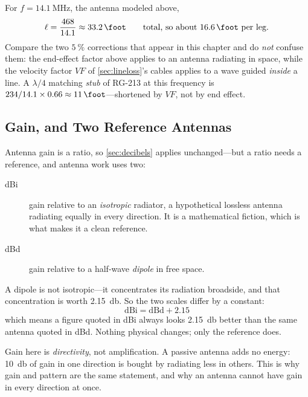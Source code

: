 \begin{workedbox}
For \(f=\SI{14.1}{\mega\hertz}\), the antenna modeled above,
\[
\ell=\frac{468}{14.1}\approx\SI{33.2}{\foot}
\qquad\text{total, so about \SI{16.6}{\foot} per leg.}
\]
Compare the two \(\SI{5}{\percent}\) corrections that appear in this chapter and do
\emph{not} confuse them: the end-effect factor above applies to an antenna radiating
in space, while the velocity factor \(VF\) of \cref{sec:lineloss}'s cables applies to
a wave guided \emph{inside} a line. A \(\lambda/4\) matching \emph{stub} of RG-213 at
this frequency is \(234/14.1\times0.66\approx\SI{11}{\foot}\)---shortened by
\(VF\), not by end effect.
\end{workedbox}

\subsection{Gain, and Two Reference Antennas}
Antenna gain is a ratio, so \cref{sec:decibels} applies unchanged---but a ratio needs
a reference, and antenna work uses two:
\begin{description}
\item[dBi] gain relative to an \emph{isotropic} radiator, a hypothetical lossless
antenna radiating equally in every direction. It is a mathematical fiction, which is
what makes it a clean reference.
\item[dBd] gain relative to a half-wave \emph{dipole} in free space.
\end{description}
A dipole is not isotropic---it concentrates its radiation broadside, and that
concentration is worth \SI{2.15}{\decibel}. So the two scales differ by a constant:
\[
\boxed{\;\mathrm{dBi}=\mathrm{dBd}+2.15\;}
\]
which means a figure quoted in dBi always looks \SI{2.15}{\decibel} better than the
same antenna quoted in dBd. Nothing physical changes; only the reference does.

\begin{mistakebox}
Gain here is \emph{directivity}, not amplification. A passive antenna adds no energy:
\SI{10}{\decibel} of gain in one direction is bought by radiating less in others.
This is why gain and pattern are the same statement, and why an antenna cannot have
gain in every direction at once.
\end{mistakebox}

